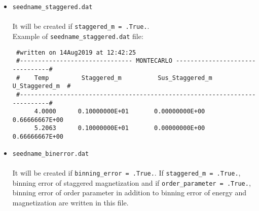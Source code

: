 \documentclass[10pt]{report}
\begin{document}
\begin{itemize}
Example of {\tt seedname\_spincorr.dat}  file:
{\scriptsize    
\begin{verbatim}
 #written on  1Oct2019 at 17:48:28 
 #---------------------------------------------------- MONTECARLO ----------------------------------------------------#
 #  Temp    Shell   Atom1   Type1   Atom2   Type2   <\sum_{ij} Si.Sj/N>   <\sum_{ij}|Si.Sj|/N>   <|\sum_{ij}Si.Sj|/N> #
 #--------------------------------------------------------------------------------------------------------------------#
   4.0000     1      Mn       1      Mn       1        -0.004510787           0.947671182             0.004510787
   4.0000     2      Mn       1      Mn       1        -0.965193441           0.965193441             0.965193441
   4.0000     3      Mn       1      Mn       1         0.002716083           0.947556974             0.002716083
   4.0000     4      Mn       1      Mn       1         0.957626944           0.957626945             0.957626944
\end{verbatim}
}
\item {\tt seedname\_staggered.dat}\\\\
It will be created  if {\tt staggered\_m = .True.}. \\


Example of {\tt seedname\_staggered.dat}  file:
{\scriptsize    
\begin{verbatim}
 #written on 14Aug2019 at 12:42:25 
 #------------------------------- MONTECARLO --------------------------------#
 #    Temp         Staggered_m          Sus_Staggered_m       U_Staggered_m  #
 #---------------------------------------------------------------------------#
      4.0000      0.10000000E+01       0.00000000E+00        0.66666667E+00
      5.2063      0.10000000E+01       0.00000000E+00        0.66666667E+00
\end{verbatim}
}
\item {\tt seedname\_binerror.dat}\\\\
It will be created  if {\tt binning\_error = .True.}. If {\tt staggered\_m = .True.}, binning error of
staggered magnetization and if {\tt order\_parameter = .True.}, binning error of
order parameter in addition to binning error of energy and magnetization are written in this file.\\



\end{itemize}
\end{document}

